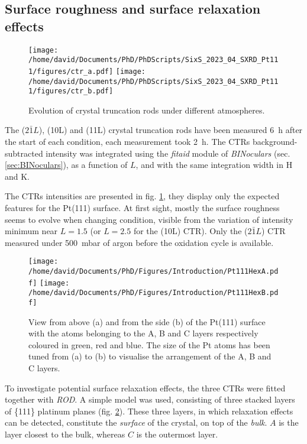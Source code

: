 \subsection{Surface roughness and surface relaxation effects}

\begin{figure}[!htb]
    \centering
    \texttt{[image: /home/david/Documents/PhD/PhDScripts/SixS\_2023\_04\_SXRD\_Pt111/figures/ctr\_a.pdf]}
    \texttt{[image: /home/david/Documents/PhD/PhDScripts/SixS\_2023\_04\_SXRD\_Pt111/figures/ctr\_b.pdf]}
    \caption{
        Evolution of crystal truncation rods under different atmospheres.
    }
    \label{fig:CTRPt111}
\end{figure}

The ($2\bar{1}L$), (10L) and (11L) crystal truncation rods have been measured \qty{6}{\hour} after the start of each condition, each measurement took \qty{2}{\hour}.
The CTRs background-subtracted intensity was integrated using the \textit{fitaid} module of \textit{BINoculars} (sec. \ref{sec:BINoculars}), as a function of $L$, and with the same integration width in H and K.

The CTRs intensities are presented in fig. \ref{fig:CTRPt111}, they display only the expected features for the Pt(111) surface.
At first sight, mostly the surface roughness seems to evolve when changing condition, visible from the variation of intensity minimum near $L=1.5$ (or $L=2.5$ for the (10L) CTR).
Only the ($2\bar{1}L$) CTR measured under \qty{500}{\milli\bar} of argon before the oxidation cycle is available.

\begin{figure}[!htb]
    \centering
    \texttt{[image: /home/david/Documents/PhD/Figures/Introduction/Pt111HexA.pdf]}
    \texttt{[image: /home/david/Documents/PhD/Figures/Introduction/Pt111HexB.pdf]}
    \caption{
        View from above (a) and from the side (b) of the Pt(111) surface with the atoms belonging to the A, B and C layers respectively coloured in green, red and blue.
        The size of the Pt atoms has been tuned from (a) to (b) to visualise the arrangement of the A, B and C layers.
    }
    \label{fig:Pt111StructureSideAndTop}
\end{figure}

To investigate potential surface relaxation effects, the three CTRs were fitted together with \textit{ROD}.
A simple model was used, consisting of three stacked layers of \{111\} platinum planes (fig. \ref{fig:Pt111StructureSideAndTop}).
These three layers, in which relaxation effects can be detected, constitute the \textit{surface} of the crystal, on top of the \textit{bulk}.
$A$ is the layer closest to the bulk, whereas $C$ is the outermost layer.

